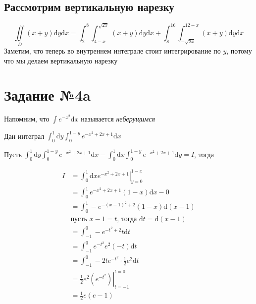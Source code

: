 \documentclass[a4paper, 10pt]{article}
\renewcommand{\d}[1]{\text{d}#1}
\begin{document}
\subsection*{Рассмотрим вертикальную нарезку}
\begin{equation*}
    \iint\limits_{D}(x+y)\d{y}\d{x}=\int_{2}^{8}\int_{4-x}^{\sqrt{2x}}(x+y)\d{y}\d{x}+\int_{8}^{16}\int_{-\sqrt{2x}}^{12-x}(x+y)\d{y}\d{x}
\end{equation*}
Заметим, что теперь во внутреннем интеграле стоит интегрирование по $y$, потому что мы делаем вертикальную нарезку


\section*{Задание №4a}
Напомним, что $\int e^{-x^2}\d{x}$ называется \textit{неберущимся}

Дан интеграл $\displaystyle\int_{0}^{1}\d{y}\int_{0}^{1-y} e^{-x^2+2x+1}\d{x}$

Пусть $\int_{0}^{1}\d{y}\int_{0}^{1-y} e^{-x^2+2x+1}\d{x}-\int_{0}^{1}\d{x}\int_{0}^{1-y} e^{-x^2+2x+1}\d{y}=I$, тогда

\begin{minipage}{0.5\textwidth}
\end{minipage}
\begin{minipage}{0.5\textwidth}
\begin{equation*}
    \begin{aligned}
        I&=\int_0^1\d{x}\left.e^{-x^2+2x+1}\right\vert^{1-x}_{y=0}\\
        &=\int_0^1 e^{-x^2+2x+1}(1-x)\d{x}-0\\
        &=\int_0^1-e^{-(x-1)^2+2}(1-x)\d{(x-1)}\\
        &\text{пусть $x-1=t$, тогда $\d{t}=\d{(x-1)}$}\\
        &=\int_{-1}^0 -e^{-t^2+2}t\d{t}\\
        &=\int_{-1}^0 e^{-t^2}e^{2}(-t)\d{t}\\
        &=\int_{-1}^{0} -2te^{-t^2}\cdot\frac{1}{2}e^2\d{t}\\
        &=\left.\frac{1}{2}e^2(e^{-t^2})\right\vert^{t=0}_{t=-1}\\
        &=\frac{1}{2}e(e-1)
    \end{aligned}
\end{equation*}
\end{minipage}
\end{document}
